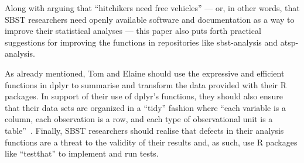 



Along with arguing that ``hitchikers need free vehicles'' --- or, in other words, that SBST researchers need openly
available software and documentation as a way to improve their statistical analyses --- this paper also puts forth
practical suggestions for improving the functions in repositories like sbst-analysis and atsp-analysis.


As already mentioned, Tom and Elaine should use the expressive and efficient functions in dplyr to summarise and
transform the data provided with their R packages. In support of their use of dplyr's functions, they should also ensure
that their data sets are organized in a ``tidy'' fashion where ``each variable is a column, each observation is a row,
and each type of observational unit is a table''~\cite{Wickham2014}.  Finally, SBST researchers should realise that
defects in their analysis functions are a threat to the validity of their results and, as such, use R packages
like ``testthat'' to implement and run tests.



